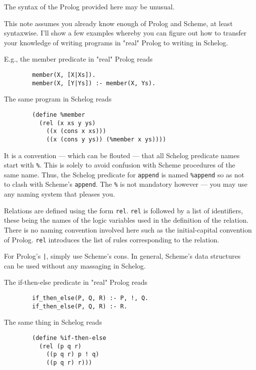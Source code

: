 The syntax of the Prolog provided here may be unusual.
\medskip
\par
This note assumes you already know enough of Prolog and
Scheme, at least syntaxwise.  I'll show a few examples
whereby you can figure out how to transfer your knowledge of
writing programs in "real" Prolog to writing in Schelog.
\medskip
\par
E.g., the member predicate in "real" Prolog reads
\medskip
{\baselineskip=10pt
\begin{verbatim}
        member(X, [X|Xs]).
        member(X, [Y|Ys]) :- member(X, Ys).
\end{verbatim}}
\medskip
\par
The same program in Schelog reads
\medskip
{\baselineskip=10pt
\begin{verbatim}
        (define %member
          (rel (x xs y ys)
            ((x (cons x xs)))
            ((x (cons y ys)) (%member x ys))))
\end{verbatim}}
\medskip
\par
It is a convention --- which can be flouted --- that all
Schelog predicate names start with \verb+%+.  This is solely to
avoid confusion with Scheme procedures of the same name.
Thus, the Schelog predicate for \verb+append+ is named \verb+%append+ so
as not to clash with Scheme's \verb+append+.  The \verb+%+ is not
mandatory however --- you may use any naming system that
pleases you.
\medskip
\par
Relations are defined using the form \verb+rel+.  \verb+rel+ is followed
by a list of identifiers, these being the names of the logic
variables used in the definition of the relation.  There is
no naming convention involved here such as the
initial-capital convention of Prolog.  \verb+rel+ introduces the
list of rules corresponding to the relation.
\medskip
\par
For Prolog's \verb+|+, simply use Scheme's cons.  In general,
Scheme's data structures can be used without any massaging
in Schelog.
\medskip
\par
The if-then-else predicate in "real" Prolog reads
\medskip
{\baselineskip=10pt
\begin{verbatim}
        if_then_else(P, Q, R) :- P, !, Q.
        if_then_else(P, Q, R) :- R.
\end{verbatim}}
\medskip
\par
The same thing in Schelog reads
\medskip
{\baselineskip=10pt
\begin{verbatim}
        (define %if-then-else
          (rel (p q r)
            ((p q r) p ! q)
            ((p q r) r)))
\end{verbatim}}
